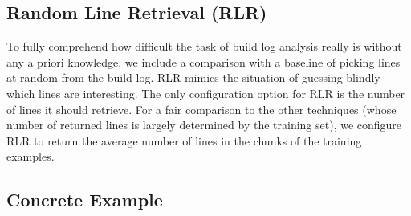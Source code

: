 \documentclass[10pt,journal,compsoc]{IEEEtran}
\begin{document}
\subsection{Random Line Retrieval (RLR)}
\label{sec:expl-rlr}
To fully comprehend how difficult the task of build log analysis really
is without any a priori knowledge, we include a comparison with a
baseline of
picking lines at random from the build log.
RLR mimics the
situation of guessing blindly which lines are interesting.
The only configuration option for RLR is the number of lines it should
retrieve.
For a fair comparison to the other techniques (whose number of
returned lines is largely determined by the training set),
we configure RLR to return the average
number of lines in the chunks of the training examples.

\subsection{Concrete Example}
\label{sec:crt-example}
\end{document}
